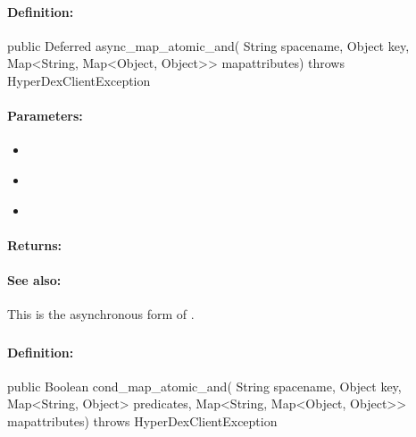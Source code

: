 \paragraph{Definition:}
\begin{javacode}
public Deferred async_map_atomic_and(
        String spacename,
        Object key,
        Map<String, Map<Object, Object>> mapattributes) throws HyperDexClientException
\end{javacode}

\paragraph{Parameters:}
\begin{itemize}[noitemsep]
\item {}\\

\item {}\\

\item {}\\

\end{itemize}

\paragraph{Returns:}


\paragraph{See also:}  This is the asynchronous form of .

\pagebreak
\subsubsection{}
\label{api:java:cond_map_atomic_and}


\paragraph{Definition:}
\begin{javacode}
public Boolean cond_map_atomic_and(
        String spacename,
        Object key,
        Map<String, Object> predicates,
        Map<String, Map<Object, Object>> mapattributes) throws HyperDexClientException
\end{javacode}

